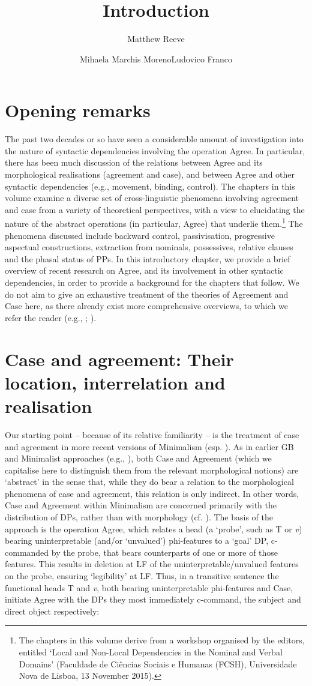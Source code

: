 \documentclass[output=paper]{langsci/langscibook}
\author{Matthew Reeve\affiliation{Zhejiang University}\and Mihaela Marchis Moreno\affiliation{FCSH, Universidade Nova de Lisboa}\lastand Ludovico Franco\affiliation{FCSH, Universidade Nova de Lisboa}}
\title{Introduction}
\begin{document}
\section{Opening remarks}

The past two decades or so have seen a considerable amount of investigation into the nature of syntactic dependencies involving the operation Agree. In particular, there has been much discussion of the relations between Agree and its morphological realisations (agreement and case), and between Agree and other syntactic dependencies (e.g., movement, binding, control). The chapters in this volume examine a diverse set of cross-linguistic phenomena involving agreement and case from a variety of theoretical perspectives, with a view to elucidating the nature of the abstract operations (in particular, Agree) that underlie them.\footnote{The chapters in this volume derive from a workshop organised by the editors, entitled ‘Local and Non-Local Dependencies in the Nominal and Verbal Domains’ (Faculdade de Ciências Sociais e Humanas (FCSH), Universidade Nova de Lisboa, 13 November 2015).} The phenomena discussed include backward control, passivisation, progressive aspectual constructions, extraction from nominals, possessives, relative clauses and the phasal status of PPs. In this introductory chapter, we provide a brief overview of recent research on Agree, and its involvement in other syntactic dependencies, in order to provide a background for the chapters that follow. We do not aim to give an exhaustive treatment of the theories of Agreement and Case here, as there already exist more comprehensive overviews, to which we refer the reader (e.g., \citealt{Bobaljik2008Case}; \citealt{Polinsky2014}).

\section{Case and agreement: Their location, interrelation and realisation}
Our starting point – because of its relative familiarity – is the treatment of case and agreement in more recent versions of Minimalism (esp. \citealt{Chomsky2000,Chomsky2000,Pesetsky2001,Pesetsky2007}). As in earlier GB and Minimalist approaches (e.g., \citealt{Chomsky1980,Chomsky1981,Chomsky1995}), both Case and Agreement (which we capitalise here to distinguish them from the relevant morphological notions) are ‘abstract’ in the sense that, while they do bear a relation to the morphological phenomena of case and agreement, this relation is only indirect. In other words, Case and Agreement within Minimalism are concerned primarily with the distribution of DPs, rather than with morphology (cf. \citealt{Bobaljik2008Case}). The basis of the approach is the operation Agree, which relates a head (a ‘probe’, such as T or \textit{v}) bearing uninterpretable (and/or ‘unvalued’) phi-features to a ‘goal’ DP, c-commanded by the probe, that bears counterparts of one or more of those features. This results in deletion at LF of the uninterpretable/unvalued features on the probe, ensuring ‘legibility’ at LF. Thus, in a transitive sentence the functional heads T and \textit{v}, both bearing uninterpretable phi-features and Case, initiate Agree with the DPs they most immediately c-command, the subject and direct object respectively:
\end{document}
